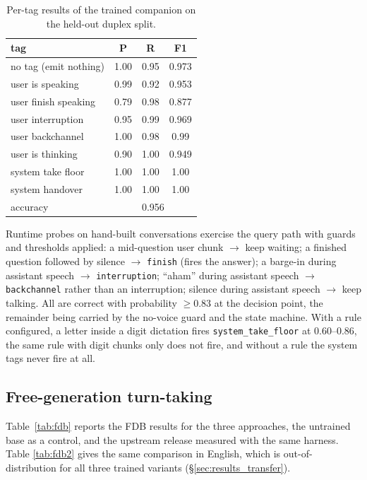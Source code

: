 \documentclass[conference]{IEEEtran}
\begin{document}
\begin{table}[t]
\centering
\caption{Per-tag results of the trained companion on the held-out duplex split.}
\label{tab:tags}
\footnotesize
\begin{tabular}{lccc}
\toprule
\textbf{tag} & \textbf{P} & \textbf{R} & \textbf{F1} \\
\midrule
no tag (emit nothing) & 1.00 & 0.95 & 0.973 \\
user is speaking & 0.99 & 0.92 & 0.953 \\
user finish speaking & 0.79 & 0.98 & 0.877 \\
user interruption & 0.95 & 0.99 & 0.969 \\
user backchannel & 1.00 & 0.98 & 0.99 \\
user is thinking & 0.90 & 1.00 & 0.949 \\
system take floor & 1.00 & 1.00 & 1.00 \\
system handover & 1.00 & 1.00 & 1.00 \\
\midrule
accuracy & \multicolumn{3}{c}{0.956} \\
\bottomrule
\end{tabular}
\end{table}

Runtime probes on hand-built conversations exercise the query path with guards and
thresholds applied: a mid-question user chunk $\rightarrow$ keep waiting; a
finished question followed by silence $\rightarrow$ \texttt{finish} (fires the
answer); a barge-in during assistant speech $\rightarrow$ \texttt{interruption};
``aham'' during assistant speech $\rightarrow$ \texttt{backchannel} rather than an
interruption; silence during assistant speech $\rightarrow$ keep talking. All are
correct with probability ${\ge}0.83$ at the decision point, the remainder being
carried by the no-voice guard and the state machine. With a rule configured, a
letter inside a digit dictation fires \texttt{system\_take\_floor} at 0.60--0.86,
the same rule with digit chunks only does not fire, and without a rule the system
tags never fire at all.

\subsection{Free-generation turn-taking}
Table~\ref{tab:fdb} reports the FDB results for the three approaches, the untrained
base as a control, and the upstream release measured with the same harness. Table
\ref{tab:fdb2} gives the same comparison in English, which is out-of-distribution
for all three trained variants (\S\ref{sec:results_transfer}).
\end{document}
